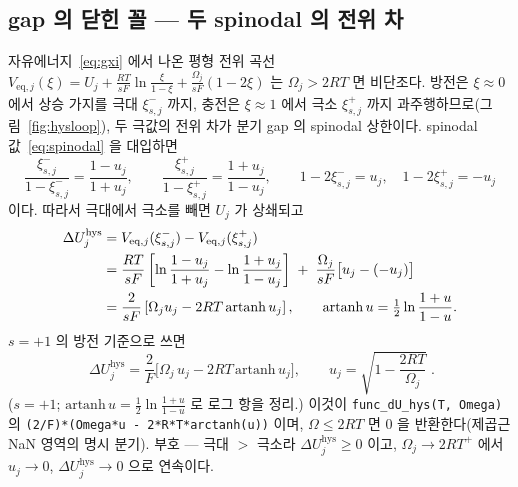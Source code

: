 \documentclass[11pt,a4paper]{article}
\newcommand{\eq}{\mathrm{eq}}
\newcommand{\hys}{\mathrm{hys}}
\newcommand{\code}[1]{\texttt{#1}}
\begin{document}
\subsection{gap 의 닫힌 꼴 — 두 spinodal 의 전위 차}
자유에너지~\eqref{eq:gxi} 에서 나온 평형 전위 곡선
$V_{\eq,j}(\xi)=U_j+\frac{RT}{sF}\ln\frac{\xi}{1-\xi}+\frac{\Omega_j}{sF}(1-2\xi)$ 는 $\Omega_j>2RT$ 면
비단조다. 방전은 $\xi\!\approx\!0$ 에서 상승 가지를 극대 $\xi_{s,j}^-$ 까지, 충전은 $\xi\!\approx\!1$ 에서 극소 $\xi_{s,j}^+$
까지 과주행하므로(그림~\ref{fig:hysloop}), 두 극값의 전위 차가 분기 gap 의 spinodal 상한이다.
spinodal 값~\eqref{eq:spinodal} 을 대입하면
\begin{equation}
\frac{\xi_{s,j}^-}{1-\xi_{s,j}^-}=\frac{1-u_j}{1+u_j},\qquad
\frac{\xi_{s,j}^+}{1-\xi_{s,j}^+}=\frac{1+u_j}{1-u_j},\qquad
1-2\xi_{s,j}^- = u_j,\quad 1-2\xi_{s,j}^+ =-u_j
\label{eq:hyssub_v8}
\end{equation}
이다. 따라서 극대에서 극소를 빼면 $U_j$ 가 상쇄되고
\begin{align}
\Delta U_j^\hys
&=V_{\eq,j}(\xi_{s,j}^-)-V_{\eq,j}(\xi_{s,j}^+)\notag\\
&=\frac{RT}{sF}\left[
\ln\frac{1-u_j}{1+u_j}-\ln\frac{1+u_j}{1-u_j}\right]
\;+\;\frac{\Omega_j}{sF}\big[u_j-(-u_j)\big]\notag\\
&=\frac{2}{sF}\left[\Omega_j u_j-2RT\,\mathrm{artanh}\,u_j\right],
\qquad \mathrm{artanh}\,u=\tfrac12\ln\frac{1+u}{1-u}.
\label{eq:dUhysderive}
\end{align}
$s=+1$ 의 방전 기준으로 쓰면
\begin{equation}
\boxed{\;\Delta U_j^\hys
=\frac{2}{F}\Big[\Omega_j\,u_j-2RT\,\mathrm{artanh}\,u_j\Big],
\qquad u_j=\sqrt{1-\frac{2RT}{\Omega_j}}\;.}
\label{eq:dUhys}
\end{equation}
($s=+1$; $\mathrm{artanh}\,u=\tfrac12\ln\tfrac{1+u}{1-u}$ 로 로그 항을 정리.) 이것이 \code{func\_dU\_hys(T, Omega)} 의
\code{(2/F)*(Omega*u - 2*R*T*arctanh(u))} 이며, $\Omega\le2RT$ 면 $0$ 을 반환한다(제곱근 NaN 영역의 명시 분기).
부호 — 극대 $>$ 극소라 $\Delta U_j^\hys\ge0$ 이고, $\Omega_j\to2RT^+$ 에서 $u_j\to0$, $\Delta U_j^\hys\to0$ 으로
연속이다.
\end{document}
